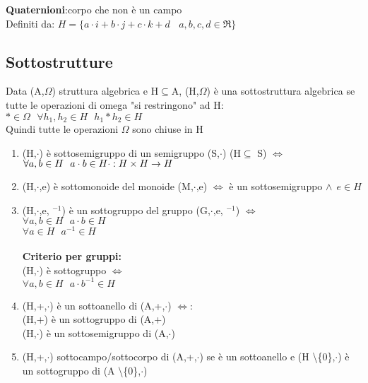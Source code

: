 \documentclass{article}
\begin{document}
\begin{multicols*}{3}
		\textbf{Quaternioni}:corpo che non è un campo\\
		Definiti da: \(H=\{a\cdot i+b\cdot j+c\cdot k+d \:\:\:\: a,b,c,d\in \Re \}\)
		
		\subsection{Sottostrutture}
		Data (A,\(\Omega\)) struttura algebrica e H\(\subseteq\)A, (H,\(\Omega\)) è una sottostruttura algebrica se tutte le operazioni di omega "si restringono" ad H:\\
		\(*\in \Omega \:\:\: \forall h_1,h_2\in H \:\:\: h_1*h_2\in H\)\\
		Quindi tutte le operazioni \(\Omega\) sono chiuse in H\\
		\begin{enumerate}
			\item (H,\(\cdot\)) è sottosemigruppo di un semigruppo (S,\(\cdot\)) (H\(\subseteq\) S) \(\iff\) \(\forall a,b \in H \:\:\: a\cdot b\in H \\ \cdot : H\times H \rightarrow H\)
			\item (H,\(\cdot\),e) è sottomonoide del monoide (M,\(\cdot\),e) \(\iff\) è un sottosemigruppo \(\land \:\: e \in H\)
			\item (H,\(\cdot\),e, \(^{-1}\)) è un sottogruppo del gruppo (G,\(\cdot\),e, \(^{-1}\)) \(\iff\)\\ \(\forall a,b \in H \:\:\: a\cdot b \in H\) \\
			\(\forall a \in H \:\:\: a^{-1} \in H\)\\\\
			\textbf{Criterio per gruppi:}\\ (H,\(\cdot\)) è sottogruppo \(\iff\) \\
			\(\forall a,b \in H \:\:\: a\cdot b^{-1} \in H\)
			\item (H,+,\(\cdot\)) è un sottoanello di (A,+,\(\cdot\)) \(\iff\):\\
			(H,+) è un sottogruppo di (A,+)\\
			(H,\(\cdot\)) è un sottosemigruppo di  (A,\(\cdot\))
			\item (H,+,\(\cdot\)) sottocampo/sottocorpo di (A,+,\(\cdot\)) se è un sottoanello e (H \textbackslash \{0\},\(\cdot\)) è un sottogruppo di (A \textbackslash \{0\},\(\cdot\))
		\end{enumerate} 
		

\end{multicols*}
\end{document}
